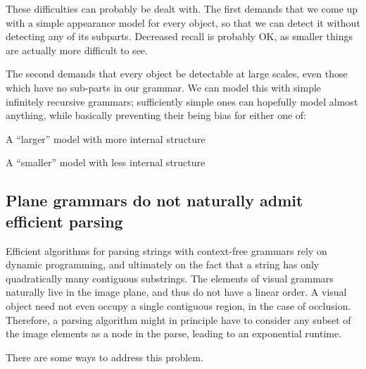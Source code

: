 These difficulties can probably be dealt with. The first demands that
we come up with a simple appearance model for every object, so that we
can detect it without detecting any of its subparts. Decreased recall
is probably OK, as smaller things are actually more difficult to see.

The second demands that every object be detectable at large scales,
even those which have no sub-parts in our grammar. We can model this
with simple infinitely recursive grammars; sufficiently simple ones
can hopefully model almost anything, while basically preventing their
being bias for either one of: 
\bitem
\item A ``larger'' model with more internal structure
\item A ``smaller'' model with less internal structure
\eitem

\subsection{Plane grammars do not naturally admit efficient parsing}

Efficient algorithms for parsing strings with context-free grammars
rely on dynamic programming, and ultimately on the fact that a string
has only quadratically many contiguous substrings. The elements of
visual grammars naturally live in the image plane, and thus do not
have a linear order. A visual object need not even occupy a single
contiguous region, in the case of occlusion. Therefore, a parsing
algorithm might in principle have to consider any subset of the image
elements as a node in the parse, leading to an exponential runtime.

There are some ways to address this problem.



